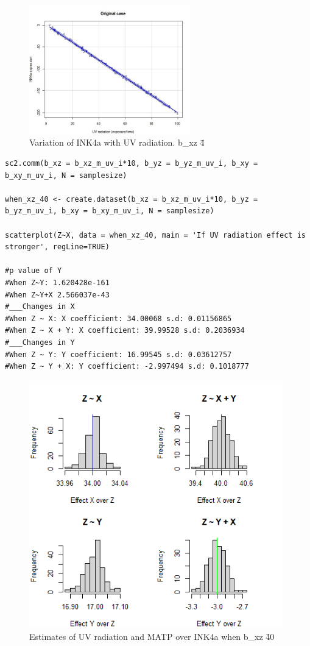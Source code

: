 \documentclass{article}
\begin{document}
\begin{figure}[h]
\caption{Variation of INK4a with UV radiation. b\_xz \= 4}
\includegraphics[width=7cm]{scatterplotOriginal.jpeg}
\centering
\end{figure}
\begin{lstlisting}
sc2.comm(b_xz = b_xz_m_uv_i*10, b_yz = b_yz_m_uv_i, b_xy = b_xy_m_uv_i, N = samplesize)

when_xz_40 <- create.dataset(b_xz = b_xz_m_uv_i*10, b_yz = b_yz_m_uv_i, b_xy = b_xy_m_uv_i, N = samplesize)

scatterplot(Z~X, data = when_xz_40, main = 'If UV radiation effect is stronger', regLine=TRUE)

#p value of Y
#When Z~Y: 1.620428e-161
#When Z~Y+X 2.566037e-43 
#___Changes in X
#When Z ~ X: X coefficient: 34.00068 s.d: 0.01156865
#When Z ~ X + Y: X coefficient: 39.99528 s.d: 0.2036934
#___Changes in Y
#When Z ~ Y: Y coefficient: 16.99545 s.d: 0.03612757
#When Z ~ Y + X: Y coefficient: -2.997494 s.d: 0.1018777
\end{lstlisting}

\begin{figure}[h]
\caption{Estimates of UV radiation and MATP over INK4a when b\_xz \= 40}
\includegraphics[width=11cm]{hist40.png}
\centering
\end{figure}
\end{document}

